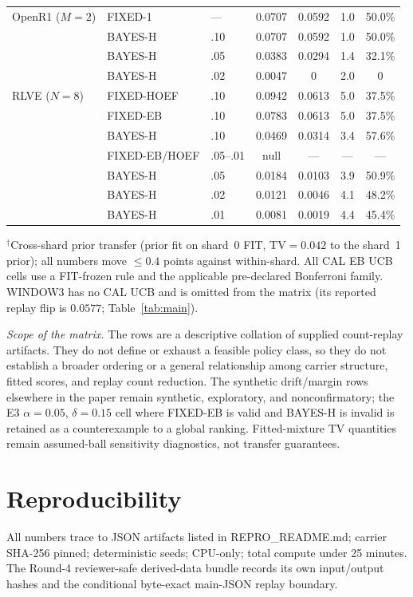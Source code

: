 \documentclass{article}
\theoremstyle{definition}
\theoremstyle{remark}
\begin{document}
\begin{table}[h]
\begin{tabular}{lllcccc}
\midrule
OpenR1 ($M{=}2$)    & FIXED-1    & --- & 0.0707 & 0.0592 & 1.0 & 50.0\% \\
                    & BAYES-H    & .10 & 0.0707 & 0.0592 & 1.0 & 50.0\% \\
                    & BAYES-H    & .05 & 0.0383 & 0.0294 & 1.4 & 32.1\% \\
                    & BAYES-H    & .02 & 0.0047 & 0 & 2.0 & 0 \\
\midrule
RLVE ($N{=}8$)      & FIXED-HOEF & .10 & 0.0942 & 0.0613 & 5.0 & 37.5\% \\
                    & FIXED-EB   & .10 & 0.0783 & 0.0613 & 5.0 & 37.5\% \\
                    & BAYES-H    & .10 & 0.0469 & 0.0314 & 3.4 & 57.6\% \\
                    & FIXED-EB/HOEF & .05--.01 & null & --- & --- & --- \\
                    & BAYES-H    & .05 & 0.0184 & 0.0103 & 3.9 & 50.9\% \\
                    & BAYES-H    & .02 & 0.0121 & 0.0046 & 4.1 & 48.2\% \\
                    & BAYES-H    & .01 & 0.0081 & 0.0019 & 4.4 & 45.4\% \\
\bottomrule
\end{tabular}
\vspace{2pt}
\begin{minipage}{\linewidth}\footnotesize
$^\dagger$Cross-shard prior transfer (prior fit on shard~0 FIT,
$\mathrm{TV}{=}0.042$ to the shard~1 prior); all numbers move ${\le}0.4$
points against within-shard. All CAL EB UCB cells use a FIT-frozen rule and
the applicable pre-declared Bonferroni family. WINDOW3 has no CAL UCB and is
omitted from the matrix (its reported replay flip is $0.0577$;
Table~\ref{tab:main}).
\end{minipage}
\end{table}

\emph{Scope of the matrix.} The rows are a descriptive collation of supplied
count-replay artifacts. They do not define or exhaust a feasible policy class,
so they do not establish a broader ordering or a general relationship among
carrier structure, fitted scores, and replay count reduction. The
synthetic drift/margin rows elsewhere in the paper remain synthetic,
exploratory, and nonconfirmatory; the E3 $\alpha=0.05$, $\delta=0.15$ cell
where FIXED-EB is valid and BAYES-H is invalid is retained as a counterexample
to a global ranking. Fitted-mixture TV quantities remain assumed-ball
sensitivity diagnostics, not transfer guarantees.

\section{Reproducibility}
\label{app:repro}
All numbers trace to JSON artifacts listed in REPRO\_README.md; carrier
SHA-256 pinned; deterministic seeds; CPU-only; total compute under 25 minutes.
The Round-4 reviewer-safe derived-data bundle records its own input/output
hashes and the conditional byte-exact main-JSON replay boundary.
\end{document}
